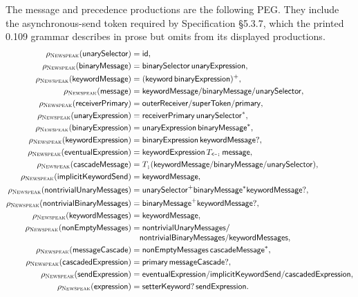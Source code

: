 The message and precedence productions are the following PEG.  They include
the asynchronous-send token required by Specification \S5.3.7, which the
printed 0.109 grammar describes in prose but omits from its displayed
productions.
\begin{equation}\label{eq:newspeak-message-peg}
\begin{aligned}
 \rho_{\textsc{Newspeak}}(\mathsf{unarySelector})&=\mathsf{id},\\
 \rho_{\textsc{Newspeak}}(\mathsf{binaryMessage})&=
      \mathsf{binarySelector}\,\mathsf{unaryExpression},\\
 \rho_{\textsc{Newspeak}}(\mathsf{keywordMessage})&=
      (\mathsf{keyword}\,\mathsf{binaryExpression})^+,\\
 \rho_{\textsc{Newspeak}}(\mathsf{message})&=
      \mathsf{keywordMessage}/\mathsf{binaryMessage}/\mathsf{unarySelector},\\
 \rho_{\textsc{Newspeak}}(\mathsf{receiverPrimary})&=
      \mathsf{outerReceiver}/\mathsf{superToken}/\mathsf{primary},\\
 \rho_{\textsc{Newspeak}}(\mathsf{unaryExpression})&=
      \mathsf{receiverPrimary}\,\mathsf{unarySelector}^*,\\
 \rho_{\textsc{Newspeak}}(\mathsf{binaryExpression})&=
      \mathsf{unaryExpression}\,\mathsf{binaryMessage}^*,\\
 \rho_{\textsc{Newspeak}}(\mathsf{keywordExpression})&=
      \mathsf{binaryExpression}\,\mathsf{keywordMessage}?,\\
 \rho_{\textsc{Newspeak}}(\mathsf{eventualExpression})&=
      \mathsf{keywordExpression}\,T_{\texttt{<-:}}\,\mathsf{message},\\
 \rho_{\textsc{Newspeak}}(\mathsf{cascadeMessage})&=
      T_{\texttt{;}}(\mathsf{keywordMessage}/\mathsf{binaryMessage}/
                       \mathsf{unarySelector}),\\
 \rho_{\textsc{Newspeak}}(\mathsf{implicitKeywordSend})&=\mathsf{keywordMessage},\\
 \rho_{\textsc{Newspeak}}(\mathsf{nontrivialUnaryMessages})&=
      \mathsf{unarySelector}^+\mathsf{binaryMessage}^*
      \mathsf{keywordMessage}?,\\
 \rho_{\textsc{Newspeak}}(\mathsf{nontrivialBinaryMessages})&=
      \mathsf{binaryMessage}^+\mathsf{keywordMessage}?,\\
 \rho_{\textsc{Newspeak}}(\mathsf{keywordMessages})&=\mathsf{keywordMessage},\\
 \rho_{\textsc{Newspeak}}(\mathsf{nonEmptyMessages})&=
      \mathsf{nontrivialUnaryMessages}/\\[-1mm]
 &\quad\mathsf{nontrivialBinaryMessages}/\mathsf{keywordMessages},\\
 \rho_{\textsc{Newspeak}}(\mathsf{messageCascade})&=
      \mathsf{nonEmptyMessages}\,\mathsf{cascadeMessage}^*,\\
 \rho_{\textsc{Newspeak}}(\mathsf{cascadedExpression})&=
      \mathsf{primary}\,\mathsf{messageCascade}?,\\
 \rho_{\textsc{Newspeak}}(\mathsf{sendExpression})&=
      \mathsf{eventualExpression}/\mathsf{implicitKeywordSend}/
      \mathsf{cascadedExpression},\\
 \rho_{\textsc{Newspeak}}(\mathsf{expression})&=
      \mathsf{setterKeyword}?\,\mathsf{sendExpression}.
\end{aligned}
\end{equation}
